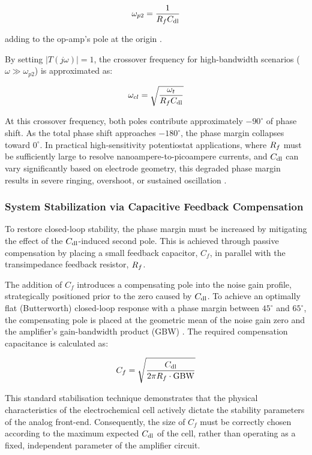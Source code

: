 \begin{equation}
\omega_{p2} = \frac{1}{R_{f}C_{\mathrm{dl}}}
\label{eq:wp2}
\end{equation}
 
adding to the op-amp's pole at the origin \cite{franco2014design}.
 
By setting $|T(j\omega)| = 1$, the crossover frequency for high-bandwidth scenarios ($\omega \gg \omega_{p2}$) is approximated as:
 
\begin{equation}
\omega_{cl} = \sqrt{\frac{\omega_t}{R_{f}C_{\mathrm{dl}}}}
\label{eq:wcl_tia}
\end{equation}
 
At this crossover frequency, both poles contribute approximately $-90^\circ$ of phase shift. As the total phase shift approaches $-180^\circ$, the phase margin collapses toward $0^\circ$. In practical high-sensitivity potentiostat applications, where $R_{f}$ must be sufficiently large to resolve nanoampere-to-picoampere currents, and $C_{\mathrm{dl}}$ can vary significantly based on electrode geometry, this degraded phase margin results in severe ringing, overshoot, or sustained oscillation \cite{adi_mt059}.
 
\subsubsection{System Stabilization via Capacitive Feedback Compensation}
\label{sec:cf-compensation}
 
To restore closed-loop stability, the phase margin must be increased by mitigating the effect of the $C_{\mathrm{dl}}$-induced second pole. This is achieved through passive compensation by placing a small feedback capacitor, $C_f$, in parallel with the transimpedance feedback resistor, $R_{f}$.
 
The addition of $C_f$ introduces a compensating pole into the noise gain profile, strategically positioned prior to the zero caused by $C_{\mathrm{dl}}$. To achieve an optimally flat (Butterworth) closed-loop response with a phase margin between $45^\circ$ and $65^\circ$, the compensating pole is placed at the geometric mean of the noise gain zero and the amplifier's gain-bandwidth product (GBW) \cite{graeme1996photodiode}. The required compensation capacitance is calculated as:
 
\begin{equation}
C_f = \sqrt{\frac{C_{\mathrm{dl}}}{2\pi R_{f} \cdot \mathrm{GBW}}}
\label{eq:cf}
\end{equation}
 
This standard stabilisation technique demonstrates that the physical characteristics of the electrochemical cell actively dictate the stability parameters of the analog front-end. Consequently, the size of $C_f$ must be correctly chosen according to the maximum expected $C_{\mathrm{dl}}$ of the cell, rather than operating as a fixed, independent parameter of the amplifier circuit.
